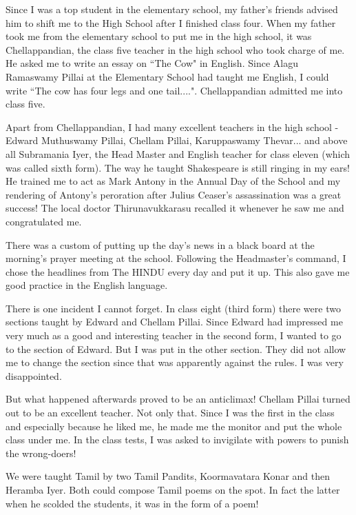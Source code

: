 Since I was a top student in the elementary school, my father's friends 
advised him to shift me to the High School after I finished class four. 
When my father took me from the elementary school to put me in the high 
school, it was Chellappandian, the class five teacher in the high school 
who took charge of me. He asked me to write an essay on ``The Cow" in 
English. Since Alagu Ramaswamy Pillai at the Elementary School had 
taught me English, I could write ``The cow has four legs and one 
tail....". Chellappandian admitted me into class five.

Apart from Chellappandian, I had many excellent teachers in the high 
school - Edward Muthuswamy Pillai, Chellam Pi\-llai, Karuppaswamy 
Thevar... and above all Subramania Iyer, the He\-ad Master and English 
teacher for class eleven (which was called sixth form). The way he 
taught Shakespeare is still ringing in my ears! He trained me to act as 
Mark Antony in the Annual Day of the School and my rendering of Antony's 
peroration after Julius Ceaser's assassination was a great success! The 
local doctor Thirunavukkarasu recalled it whenever he saw me and 
congratulated me.

There was a custom of putting up the day's news in a black board at the 
morning's prayer meeting at the school. Follo\-wing the Headmaster's 
command, I chose the headlines from The HIN\-DU every day and put it up. 
This also gave me good practice in the English language.

There is one incident I cannot forget. In class eight (third form) there 
were two sections taught by Edward and Chellam Pillai. Since Edward had 
impressed me very much as a good and interesting teacher in the second 
form, I wanted to go to the section of Edward. But I was put in the 
other section. They did not allow me to change the section since that 
was apparently against the rules. I was very disappointed.

But what happened afterwards proved to be an anticlimax! Chellam Pillai 
turned out to be an excellent teacher. Not only that. Since I was the 
first in the class and especially because he liked me, he made me the 
monitor and put the whole class under me. In the class tests, I was 
asked to invigilate with powers to punish the wrong-doers!

We were taught Tamil by two Tamil Pandits, Koormavatara Konar and then 
Heramba Iyer. Both could compose Tamil poems on the spot. In fact the 
latter when he scolded the students, it was in the form of a poem!

